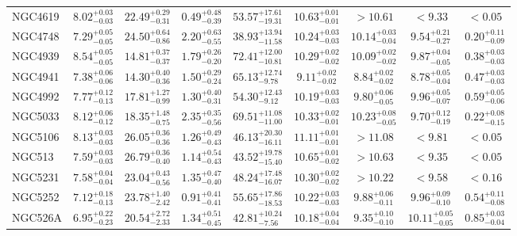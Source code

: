 \documentclass[onecolumn]{mn2e}
\begin{document}
{\begin{center}
\begin{longtable}{lcccccccc}
NGC4619 & $8.02_{-0.03}^{+0.03}$ & $22.49_{-0.31}^{+0.29}$ & $0.49_{-0.39}^{+0.48}$ &$53.57_{-19.31}^{+17.61}$ & $10.63_{-0.01}^{+0.01}$ & $>10.61$ & $<9.33$ & $<0.05$ \\
NGC4748 & $7.29_{-0.05}^{+0.05}$ & $24.50_{-0.86}^{+0.64}$ & $2.20_{-0.55}^{+0.63}$ &$38.93_{-11.58}^{+13.94}$ & $10.24_{-0.03}^{+0.03}$ & $10.14_{-0.04}^{+0.03}$ & $9.54_{-0.27}^{+0.21}$ & $0.20_{-0.09}^{+0.11}$ \\
NGC4939 & $8.54_{-0.05}^{+0.05}$ & $14.81_{-0.37}^{+0.37}$ & $1.79_{-0.20}^{+0.26}$ &$72.41_{-10.81}^{+12.00}$ & $10.29_{-0.02}^{+0.02}$ & $10.09_{-0.02}^{+0.02}$ & $9.87_{-0.05}^{+0.04}$ & $0.38_{-0.03}^{+0.03}$ \\
NGC4941 & $7.38_{-0.06}^{+0.06}$ & $14.30_{-0.36}^{+0.40}$ & $1.50_{-0.24}^{+0.29}$ &$65.13_{-9.78}^{+12.74}$ & $9.11_{-0.02}^{+0.02}$ & $8.84_{-0.02}^{+0.02}$ & $8.78_{-0.04}^{+0.05}$ & $0.47_{-0.03}^{+0.03}$ \\
NGC4992 & $7.77_{-0.13}^{+0.12}$ & $17.81_{-0.99}^{+1.27}$ & $1.30_{-0.31}^{+0.40}$ &$54.30_{-9.12}^{+12.43}$ & $10.19_{-0.03}^{+0.03}$ & $9.80_{-0.05}^{+0.06}$ & $9.96_{-0.07}^{+0.05}$ & $0.59_{-0.06}^{+0.05}$ \\
NGC5033 & $8.12_{-0.12}^{+0.06}$ & $18.35_{-0.75}^{+1.48}$ & $2.35_{-0.56}^{+0.35}$ &$69.51_{-11.00}^{+11.08}$ & $10.33_{-0.01}^{+0.02}$ & $10.23_{-0.05}^{+0.08}$ & $9.70_{-0.19}^{+0.12}$ & $0.22_{-0.15}^{+0.08}$ \\
NGC5106 & $8.13_{-0.03}^{+0.03}$ & $26.05_{-0.36}^{+0.36}$ & $1.26_{-0.43}^{+0.49}$ &$46.13_{-16.11}^{+20.30}$ & $11.11_{-0.01}^{+0.01}$ & $>11.08$ & $<9.81$ & $<0.05$ \\
NGC513 & $7.59_{-0.03}^{+0.03}$ & $26.79_{-0.40}^{+0.36}$ & $1.14_{-0.43}^{+0.54}$ &$43.52_{-15.40}^{+19.78}$ & $10.65_{-0.02}^{+0.01}$ & $>10.63$ & $<9.35$ & $<0.05$ \\
NGC5231 & $7.58_{-0.04}^{+0.04}$ & $23.04_{-0.56}^{+0.43}$ & $1.35_{-0.40}^{+0.47}$ &$48.24_{-16.07}^{+17.48}$ & $10.30_{-0.02}^{+0.02}$ & $>10.22$ & $<9.58$ & $<0.16$ \\
NGC5252 & $7.12_{-0.13}^{+0.18}$ & $23.78_{-2.42}^{+1.40}$ & $0.91_{-0.41}^{+0.41}$ &$55.65_{-18.53}^{+17.86}$ & $10.22_{-0.03}^{+0.03}$ & $9.88_{-0.11}^{+0.06}$ & $9.96_{-0.10}^{+0.09}$ & $0.54_{-0.08}^{+0.11}$ \\
NGC526A & $6.95_{-0.23}^{+0.22}$ & $20.54_{-2.33}^{+2.72}$ & $1.34_{-0.45}^{+0.51}$ &$42.81_{-7.56}^{+10.24}$ & $10.18_{-0.04}^{+0.04}$ & $9.35_{-0.10}^{+0.10}$ & $10.11_{-0.05}^{+0.05}$ & $0.85_{-0.04}^{+0.03}$ \\

\end{longtable}
\end{center}}
\end{document}
